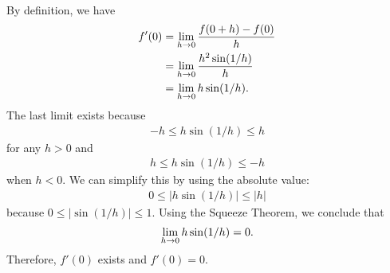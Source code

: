 	\\
	By definition, we have
		\begin{align*}
		f' (0) &= \lim_{h \rightarrow 0} \frac{f (0 + h) - f(0)}{h} \\
		&= \lim_{h \rightarrow 0} \frac{h^2 \sin (1/h)}{h} \\
		&= \lim_{h \rightarrow 0} h \sin (1/h ) .
		\end{align*}
	The last limit exists because
		\begin{align*}
		-h \leq h \sin (1/h ) \leq h
		\end{align*}
	for any $h > 0$ and
		\begin{align*}
		h \leq h \sin (1/h) \leq -h
		\end{align*}
	when $h < 0$. We can simplify this by using the absolute value:
		\begin{align*}
		0 \leq |h \sin (1/h)| \leq |h|
		\end{align*}
	because $0 \leq |\sin (1/h)| \leq 1$. Using the Squeeze Theorem, we conclude that
		\begin{align*}
		\lim_{h \rightarrow 0} h \sin (1/h) = 0 .
		\end{align*}
	Therefore, $f'(0)$ exists and $f'(0) = 0$.
	
	
